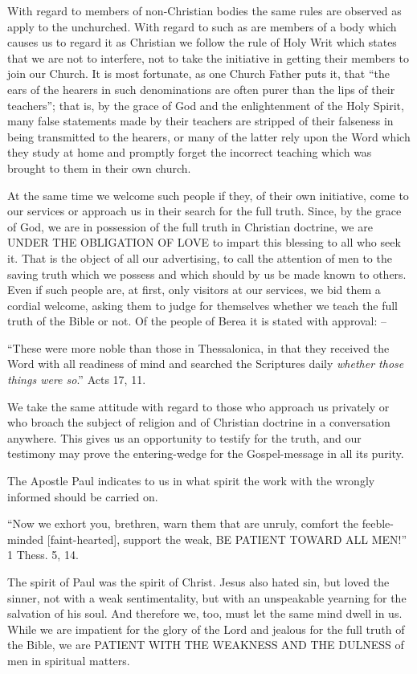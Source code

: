 \documentclass[
]{book}
\begin{document}
With regard to members of non-Christian bodies the same rules are observed as apply to the unchurched. With regard to such as are members of a body which causes us to regard it as Christian we follow the rule of Holy Writ which states that we are not to interfere, not to take the initiative in getting their members to join our Church. It is most fortunate, as one Church Father puts it, that ``the ears of the hearers in such denominations are often purer than the lips of their teachers''; that is, by the grace of God and the enlightenment of the Holy Spirit, many false statements made by their teachers are stripped of their falseness in being transmitted to the hearers, or many of the latter rely upon the Word which they study at home and promptly forget the incorrect teaching which was brought to them in their own church.

At the same time we welcome such people if they, of their own initiative, come to our services or approach us in their search for the full truth. Since, by the grace of God, we are in possession of the full truth in Christian doctrine, we are UNDER THE OBLIGATION OF LOVE to impart this blessing to all who seek it. That is the object of all our advertising, to call the attention of men to the saving truth which we possess and which should by us be made known to others. Even if such people are, at first, only visitors at our services, we bid them a cordial welcome, asking them to judge for themselves whether we teach the full truth of the Bible or not. Of the people of Berea it is stated with approval: --

``These were more noble than those in Thessalonica, in that they received the Word with all readiness of mind and searched the Scriptures daily \emph{whether those things were so}.'' Acts 17, 11.

We take the same attitude with regard to those who approach us privately or who broach the subject of religion and of Christian doctrine in a conversation anywhere. This gives us an opportunity to testify for the truth, and our testimony may prove the entering-wedge for the Gospel-message in all its purity.

The Apostle Paul indicates to us in what spirit the work with the wrongly informed should be carried on.

``Now we exhort you, brethren, warn them that are unruly, comfort the feeble-minded {[}faint-hearted{]}, support the weak, BE PATIENT TOWARD ALL MEN!'' 1 Thess. 5, 14.

The spirit of Paul was the spirit of Christ. Jesus also hated sin, but loved the sinner, not with a weak sentimentality, but with an unspeakable yearning for the salvation of his soul. And therefore we, too, must let the same mind dwell in us. While we are impatient for the glory of the Lord and jealous for the full truth of the Bible, we are PATIENT WITH THE WEAKNESS AND THE DULNESS of men in spiritual matters.
\end{document}
